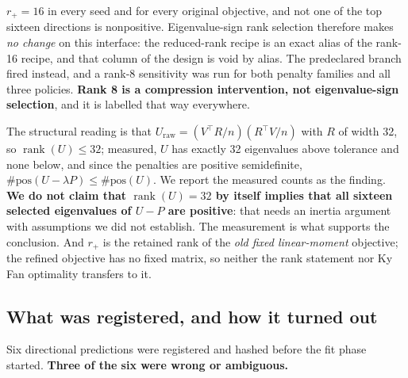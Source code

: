 \documentclass[10pt]{article}
\begin{document}
$r_+=16$ in every seed and for every original objective, and not one of the top sixteen directions
is nonpositive. Eigenvalue-sign rank selection therefore makes \emph{no change} on this interface:
the reduced-rank recipe is an exact alias of the rank-16 recipe, and that column of the design is
void by alias. The predeclared branch fired instead, and a rank-8 sensitivity was run for both
penalty families and all three policies. \textbf{Rank 8 is a compression intervention, not
eigenvalue-sign selection}, and it is labelled that way everywhere.

The structural reading is that $U_{\mathrm{raw}}=(V^\top\!R/n)(R^\top\!V/n)$ with $R$ of width 32,
so $\operatorname{rank}(U)\le 32$; measured, $U$ has exactly 32 eigenvalues above tolerance and none
below, and since the penalties are positive semidefinite,
$\#\text{pos}(U-\lambda P)\le\#\text{pos}(U)$. We report the measured counts as the finding.
\textbf{We do not claim that $\operatorname{rank}(U)=32$ by itself implies that all sixteen selected
eigenvalues of $U-P$ are positive}: that needs an inertia argument with assumptions we did not
establish. The measurement is what supports the conclusion. And $r_+$ is the retained rank of the
\emph{old fixed linear-moment} objective; the refined objective has no fixed matrix, so neither the
rank statement nor Ky Fan optimality transfers to it.

\subsection{What was registered, and how it turned out}
\label{sec:registered2}

Six directional predictions were registered and hashed before the fit phase started.
\textbf{Three of the six were wrong or ambiguous.}
\end{document}
